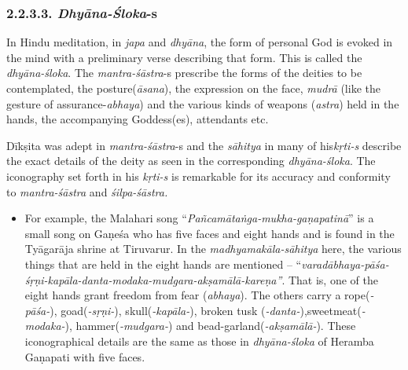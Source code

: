 \subsubsection*{2.2.3.3. \textit{Dhyāna-Śloka}-s}

In Hindu meditation, in \textit{japa} and \textit{dhyāna}, the form of personal God is evoked in the mind with a preliminary verse describing that form. This is called the \textit{dhyāna-śloka}. The \textit{mantra-śāstra}-s prescribe the forms of the deities to be contemplated, the posture(\textit{āsana}), the expression on the face, \textit{mudrā} (like the gesture of assurance-\textit{abhaya}) and the various kinds of weapons (\textit{astra}) held in the hands, the accompanying Goddess(es), attendants etc.

Dīkṣita was adept in \textit{mantra-śāstra}-s and the \textit{sāhitya} in many of his\break \textit{kṛti-s} describe the exact details of the deity as seen in the corresponding \textit{dhyāna-śloka}. The iconography set forth in his \textit{kṛti-s} is remarkable for its accuracy and conformity to \textit{mantra-śāstra} and \textit{śilpa-śāstra.}

\begin{itemize}

 \item For example, the Malahari song “\textit{Pañcamātaṅga-mukha-gaṇapa\-tinā}” is a small song on Gaṇeśa who has five faces and eight hands and is found in the Tyāgarāja shrine at Tiruvarur. In the \textit{madhyamakāla-sāhitya} here, the various things that are held in the eight hands are mentioned – “\textit{varadābhaya-pāśa-śṛṇi-kapāla-danta-modaka-mudgara-akṣamālā-kareṇa”}. That is, one of the eight hands grant freedom from fear (\textit{abhaya}). The others carry a rope(\textit{-pāśa-}), goad(\textit{-sṛṇi-}), skull(\textit{-kapāla-}), broken tusk (\textit{-danta-}),\break sweetmeat(\textit{-modaka-}), hammer(\textit{-mudgara-}) and bead-garland\break (\textit{-akṣamālā-}). These iconographical details are the same as those in \textit{dhyāna-śloka} of Heramba Gaṇapati with five faces.

\end{itemize}


